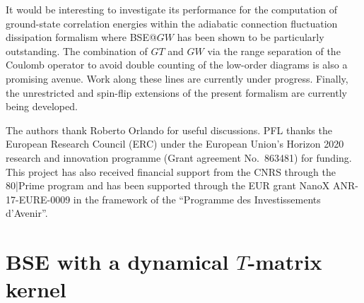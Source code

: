\documentclass[aip,jcp,reprint,noshowkeys,superscriptaddress]{revtex4-1}
\begin{document}
It would be interesting to investigate its performance for the computation of ground-state correlation energies within the adiabatic connection fluctuation dissipation formalism where BSE@$GW$ has been shown to be particularly outstanding. \cite{Maggio_2016,Holzer_2018b,Loos_2020e}
The combination of $GT$ and $GW$ via the range separation of the Coulomb operator to avoid double counting of the low-order diagrams is also a promising avenue.
Work along these lines are currently under progress.
Finally, the unrestricted and spin-flip extensions of the present formalism are currently being developed.

\begin{acknowledgements}
The authors thank Roberto Orlando for useful discussions.
PFL thanks the European Research Council (ERC) under the European Union's Horizon 2020 research and innovation programme (Grant agreement No.~863481) for funding.
This project has also received financial support from the CNRS through the 80|Prime program and has been supported through the EUR grant NanoX ANR-17-EURE-0009 in the framework of the ``Programme des Investissements d’Avenir''.
\end{acknowledgements}

\onecolumngrid
\appendix
\section{BSE with a dynamical $T$-matrix kernel}
\label{app:dBSE}
\end{document}
